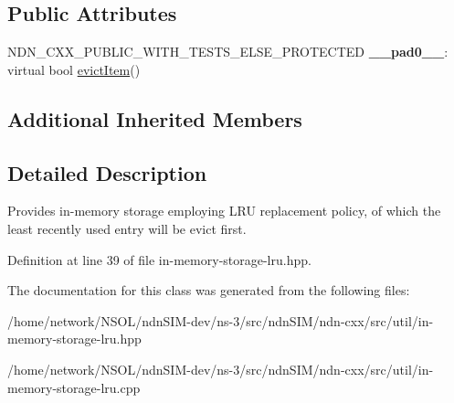 \subsection*{Public Attributes}
\begin{DoxyCompactItemize}
\item 
N\+D\+N\+\_\+\+C\+X\+X\+\_\+\+P\+U\+B\+L\+I\+C\+\_\+\+W\+I\+T\+H\+\_\+\+T\+E\+S\+T\+S\+\_\+\+E\+L\+S\+E\+\_\+\+P\+R\+O\+T\+E\+C\+T\+ED {\bfseries \+\_\+\+\_\+pad0\+\_\+\+\_\+}\+: virtual bool \hyperlink{classndn_1_1util_1_1InMemoryStorage_a14036928e195645bf47d8c5686277fd8}{evict\+Item}()\hypertarget{classndn_1_1util_1_1InMemoryStorageLru_a5f704ffaa60a4cbae290bcf26116fb7a}{}\label{classndn_1_1util_1_1InMemoryStorageLru_a5f704ffaa60a4cbae290bcf26116fb7a}

\end{DoxyCompactItemize}
\subsection*{Additional Inherited Members}


\subsection{Detailed Description}
Provides in-\/memory storage employing L\+RU replacement policy, of which the least recently used entry will be evict first. 

Definition at line 39 of file in-\/memory-\/storage-\/lru.\+hpp.



The documentation for this class was generated from the following files\+:\begin{DoxyCompactItemize}
\item 
/home/network/\+N\+S\+O\+L/ndn\+S\+I\+M-\/dev/ns-\/3/src/ndn\+S\+I\+M/ndn-\/cxx/src/util/in-\/memory-\/storage-\/lru.\+hpp\item 
/home/network/\+N\+S\+O\+L/ndn\+S\+I\+M-\/dev/ns-\/3/src/ndn\+S\+I\+M/ndn-\/cxx/src/util/in-\/memory-\/storage-\/lru.\+cpp\end{DoxyCompactItemize}
